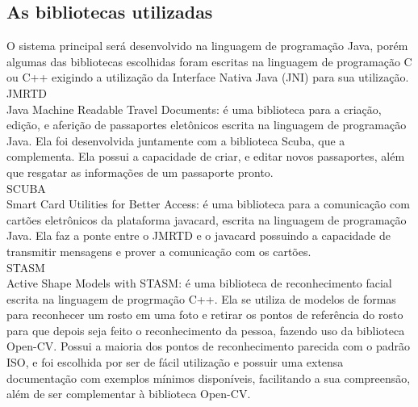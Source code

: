 \documentclass{article}
\begin{document}
	\subsection{As bibliotecas utilizadas}
		\begin{justify}
			 
		\hspace{2cm}O sistema principal será desenvolvido na linguagem de programação Java, porém algumas das bibliotecas escolhidas foram escritas na linguagem de programação C ou C++ exigindo a utilização da Interface Nativa Java (JNI) para sua utilização.\\
		
        \hspace*{2cm}JMRTD\\
    \hspace*{2cm}Java Machine Readable Travel Documents: é uma biblioteca para a criação, edição, e aferição de passaportes eletônicos escrita na linguagem de programação Java. Ela foi desenvolvida juntamente com a biblioteca Scuba, que a complementa. Ela possui a capacidade de criar, e editar novos passaportes, além que resgatar as informações de um passaporte pronto. \\
        
		\hspace*{2cm}SCUBA\\
    \hspace*{2cm}Smart Card Utilities for Better Access: é uma biblioteca para a comunicação com cartões eletrônicos da plataforma javacard, escrita na linguagem de programação Java. Ela faz a ponte entre o JMRTD e o javacard possuindo a capacidade de transmitir mensagens e prover a comunicação com os cartões.\\
		
        \hspace*{2cm}STASM\\
    \hspace*{2cm}Active Shape Models with STASM: é uma biblioteca de reconhecimento facial escrita na linguagem de progrmação C++. Ela se utiliza de modelos de formas para reconhecer um rosto em uma foto e retirar os pontos de referência do rosto para que depois seja feito o reconhecimento da pessoa, fazendo uso da biblioteca Open-CV. Possui a maioria dos pontos de reconhecimento parecida com o padrão ISO\parencite{ISO}, e foi escolhida por ser de fácil utilização e possuir uma extensa documentação com exemplos mínimos disponíveis, facilitando a sua compreensão, além de ser complementar à biblioteca Open-CV.\\
		

\end{justify}
\end{document}
